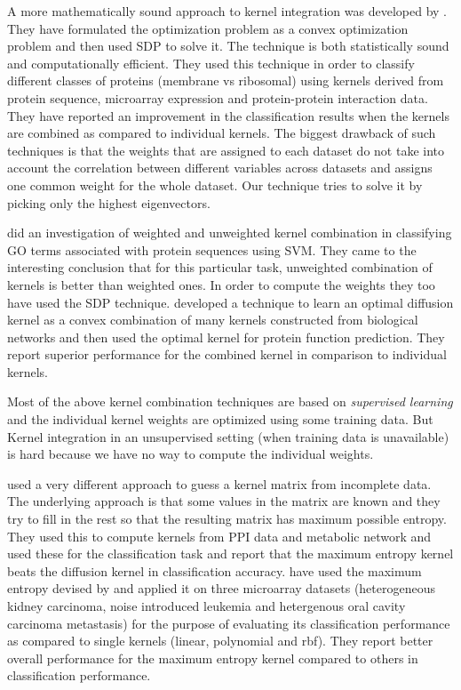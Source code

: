 A more mathematically sound approach to kernel integration was developed by \citet{lanck04kerneldatafusion}. They have formulated the optimization 
problem as a convex optimization problem and then used \ac{SDP} to solve it. The technique is both statistically sound and computationally efficient. 
They used this technique in order to classify different classes of proteins (membrane vs ribosomal) using kernels derived from protein 
sequence, microarray expression and protein-protein interaction data. They have reported an improvement in the classification results when 
the kernels are combined as compared to individual kernels. The biggest drawback of such techniques is that the weights that are assigned to each 
dataset do not take into account the correlation between different variables across datasets and assigns one common weight for the 
whole dataset. Our technique tries to solve it by picking only the highest eigenvectors.

\citet{lewis06svm} did an investigation of weighted and unweighted kernel combination in classifying GO terms associated with protein 
sequences using SVM. They came to the interesting conclusion that for this particular task, unweighted combination of kernels 
is better than weighted ones. In order to compute the weights they too have used the SDP technique. \citet{Liang2008Adaptive} 
developed a technique to learn an optimal diffusion kernel as a convex combination of many kernels constructed from biological networks 
and then used the optimal kernel for protein function prediction. They report superior performance for the combined kernel 
in comparison to individual kernels. 

Most of the above kernel combination techniques are based on \textit{supervised learning} and the individual kernel weights are 
optimized using some training data. But Kernel integration in an unsupervised setting (when training data is unavailable) is hard 
because we have no way to compute the individual weights. 

\citet{Tsuda2004Learning} used a very different approach to guess a kernel matrix from incomplete data. The underlying approach is that some 
values in the matrix are known and they try to fill in the rest so that the resulting matrix has maximum possible entropy. 
They used this to compute kernels from PPI data and metabolic network and used these for the classification task and report that 
the maximum entropy kernel beats the diffusion kernel in classification accuracy. \citet{fujibuchi2007classification} have used the maximum 
entropy devised by \citet{Tsuda2004Learning} and applied it on three microarray datasets (heterogeneous kidney carcinoma, noise introduced 
leukemia and hetergenous oral cavity carcinoma metastasis) for the purpose of evaluating its classification performance as compared to 
single kernels (linear, polynomial and rbf). They report better overall performance for the maximum entropy kernel compared 
to others in classification performance.  

